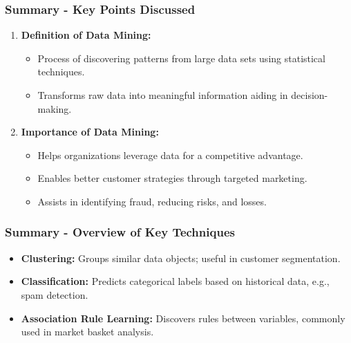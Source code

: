 \documentclass[aspectratio=169]{beamer}
\begin{document}
\begin{frame}[fragile]
    \frametitle{Summary - Key Points Discussed}
    \begin{enumerate}
        \item \textbf{Definition of Data Mining:}
        \begin{itemize}
            \item Process of discovering patterns from large data sets using statistical techniques.
            \item Transforms raw data into meaningful information aiding in decision-making.
        \end{itemize}
        
        \item \textbf{Importance of Data Mining:}
        \begin{itemize}
            \item Helps organizations leverage data for a competitive advantage.
            \item Enables better customer strategies through targeted marketing.
            \item Assists in identifying fraud, reducing risks, and losses.
        \end{itemize}
    \end{enumerate}
\end{frame}

\begin{frame}[fragile]
    \frametitle{Summary - Overview of Key Techniques}
    \begin{itemize}
        \item \textbf{Clustering:} Groups similar data objects; useful in customer segmentation.
        \item \textbf{Classification:} Predicts categorical labels based on historical data, e.g., spam detection.
        \item \textbf{Association Rule Learning:} Discovers rules between variables, commonly used in market basket analysis.
    \end{itemize}
\end{frame}
\end{document}
